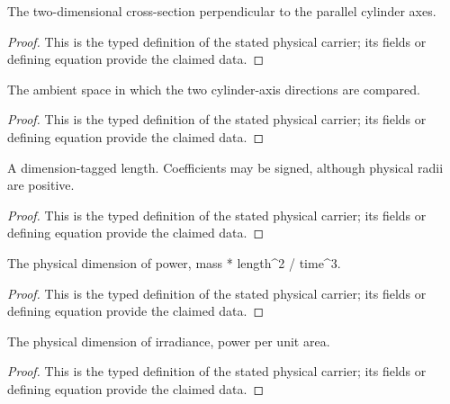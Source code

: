 \begin{definition}
  \label{def:physics:IPhO_2026_2_B_1:aux001}
  The two-dimensional cross-section perpendicular to the parallel cylinder axes.
\end{definition}
\begin{proof}
  This is the typed definition of the stated physical carrier; its fields or defining equation provide the claimed data.
\end{proof}

\begin{definition}
  \label{def:physics:IPhO_2026_2_B_1:aux002}
  The ambient space in which the two cylinder-axis directions are compared.
\end{definition}
\begin{proof}
  This is the typed definition of the stated physical carrier; its fields or defining equation provide the claimed data.
\end{proof}

\begin{definition}
  \label{def:physics:IPhO_2026_2_B_1:aux003}
  A dimension-tagged length. Coefficients may be signed, although physical radii are positive.
\end{definition}
\begin{proof}
  This is the typed definition of the stated physical carrier; its fields or defining equation provide the claimed data.
\end{proof}

\begin{definition}
  \label{def:physics:IPhO_2026_2_B_1:aux004}
  The physical dimension of power, mass * length\textasciicircum{}2 / time\textasciicircum{}3.
\end{definition}
\begin{proof}
  This is the typed definition of the stated physical carrier; its fields or defining equation provide the claimed data.
\end{proof}

\begin{definition}
  \label{def:physics:IPhO_2026_2_B_1:aux005}
  The physical dimension of irradiance, power per unit area.
\end{definition}
\begin{proof}
  This is the typed definition of the stated physical carrier; its fields or defining equation provide the claimed data.
\end{proof}

